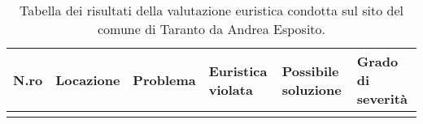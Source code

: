 \begin{longtable}[c]{@{}m{1cm}llllm{2cm}@{}}
	\caption{Tabella dei risultati della valutazione euristica condotta sul sito del comune di Taranto da Andrea Esposito.}
	\label{tab:val-euristica-AndreaEsposito}\\
	\toprule
	N.ro & Locazione & Problema & Euristica violata & Possibile soluzione & Grado di severità\footnotemark \\* \midrule
	\endhead
\\*
	\bottomrule
\end{longtable}
